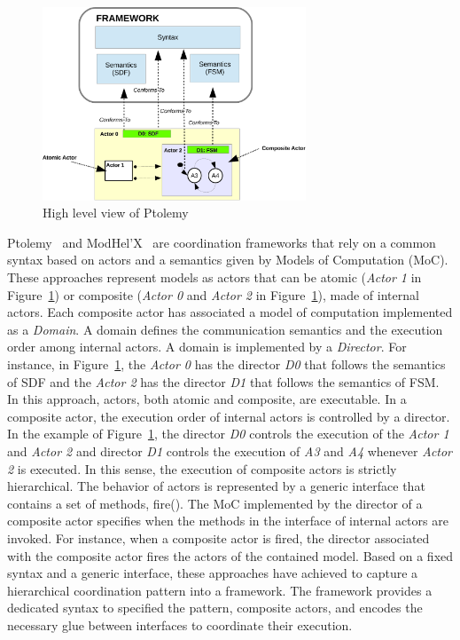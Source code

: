 	
\begin{figure}
	\begin{center}
		\includegraphics[width=0.7\textwidth]{background/figs/ptolemyfig}
		\caption{High level view of Ptolemy~\cite{giraultbib}}
		\label{fig:ptolemyfig}
	\end{center}
\end{figure}

Ptolemy~\cite{ptoleframebib} and ModHel'X~\cite{modhelxbib} are coordination frameworks that rely on a common syntax based on actors and a semantics given by Models of Computation (MoC). These approaches represent models as actors that can be atomic (\eg \emph{Actor 1} in Figure~\ref{fig:ptolemyfig}) or composite (\eg \emph{Actor 0} and \emph{Actor 2} in Figure~\ref{fig:ptolemyfig}), \ie made of internal actors. Each composite actor has associated a model of computation implemented as a \emph{Domain}. A domain defines the communication semantics and the execution order among internal actors. A domain is implemented by a \emph{Director}. For instance, in Figure~\ref{fig:ptolemyfig}, the \emph{Actor 0} has the director \emph{D0} that follows the semantics of SDF and the \emph{Actor 2} has the director \emph{D1} that follows the semantics of FSM. In this approach, actors, both atomic and composite, are executable. In a composite actor, the execution order of internal actors is controlled by a director. In the example of Figure~\ref{fig:ptolemyfig}, the director \emph{D0} controls the execution of the \emph{Actor 1} and \emph{Actor 2} and director \emph{D1} controls the execution of \emph{A3} and \emph{A4} whenever \emph{Actor 2} is executed. In this sense, the execution of composite actors is strictly hierarchical. The behavior of actors is represented by a generic interface that contains a set of methods, \eg fire(). The MoC implemented by the director of a composite actor specifies when the methods in the interface of internal actors are invoked. For instance, when a composite actor is fired, the director associated with the composite actor fires the actors of the contained model. Based on a fixed syntax and a generic interface, these approaches have achieved to capture a hierarchical coordination pattern into a framework. The framework provides a dedicated syntax to specified the pattern, \ie composite actors, and encodes the necessary glue between interfaces to coordinate their execution. 


